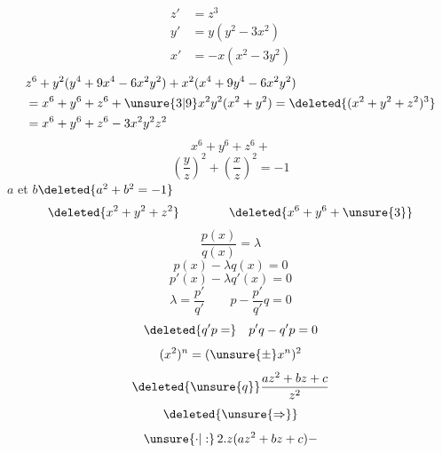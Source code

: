 \[
\begin{aligned}
z'&=z^3\\
y'&=y(y^2-3x^2)\\
x'&=-x(x^2-3y^2)
\end{aligned}
\]
\[
\begin{aligned}
&z^6+y^2(y^4+9x^4-6x^2y^2)+x^2(x^4+9y^4-6x^2y^2)\\
&=x^6+y^6+z^6+\unsure{3|9}x^2y^2(x^2+y^2)=\deleted{(x^2+y^2+z^2)^3}\\
&=x^6+y^6+z^6-3x^2y^2z^2
\end{aligned}
\]
\[x^6+y^6+z^6+\]
\[\left(\frac yz\right)^2+\left(\frac xz\right)^2=-1\]
$a$ et $b$\qquad $\deleted{a^2+b^2=-1}$
\[\deleted{x^2+y^2+z^2}\qquad\qquad\deleted{x^6+y^6+\unsure{3}}\]
\[
\frac{p(x)}{q(x)}=\lambda
\]
\[
p(x)-\lambda q(x)=0
\]
\[
p'(x)-\lambda q'(x)=0
\]
\[
\lambda=\frac{p'}{q'}\qquad p-\frac{p'}{q'}q=0
\]
\[
\deleted{q'p=}\quad p'q-q'p=0
\]
\[
(x^2)^n=(\unsure{\pm}x^n)^2
\]
\[
\deleted{\unsure{q}}\frac{az^2+bz+c}{z^2}
\]
\[
\deleted{\unsure{\Rightarrow}}
\]
\[
\unsure{\cdot|:}\,2.z(az^2+bz+c)-
\]
